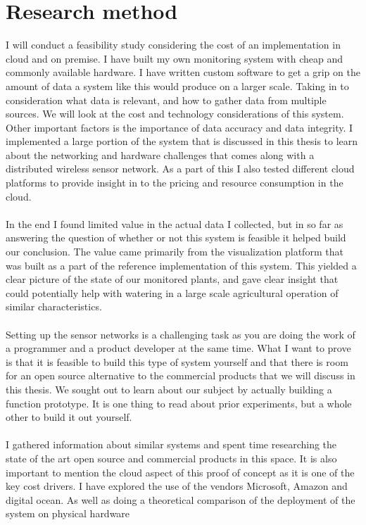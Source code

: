 \documentclass[]{uiophd}
\begin{document}
\section{Research method}
 I will conduct a feasibility study considering the cost of an implementation in cloud and on premise. I have built my own monitoring system with cheap and commonly available hardware. I have written custom software to get a grip on the amount of data a system like this would produce on a larger scale. Taking in to consideration what data is relevant, and how to gather data from multiple sources. We will look at the cost and technology considerations of this system. Other important factors is the importance of data accuracy and data integrity. I implemented a large portion of the system that is discussed in this thesis to learn about the networking and hardware challenges that comes along with a distributed wireless sensor network. As a part of this I also tested different cloud platforms to provide insight in to the pricing and resource consumption in the cloud. 
\\\\
In the end I found limited value in the actual data I collected, but in so far as answering the question of whether or not this system is feasible it helped build our conclusion. The value came primarily from the visualization platform that was built as a part of the reference implementation of this system. This yielded a clear picture of the state of our monitored plants, and gave clear insight that could potentially help with watering in a large scale agricultural operation of similar characteristics.
\\\\
Setting up the sensor networks is a challenging task as you are doing the work of a programmer and a product developer at the same time. What I want to prove is that it is feasible to build this type of system yourself and that there is room for an open source alternative to the commercial products that we will discuss in this thesis. We sought out to learn about our subject by actually building a function prototype. It is one thing to read about prior experiments, but a whole other to build it out yourself.
\\\\
I gathered information about similar systems and spent time researching the state of the art open source and commercial products in this space. It is also important to mention the cloud aspect of this proof of concept as it is one of the key cost drivers. I have explored the use of the vendors Microsoft, Amazon and digital ocean. As well as doing a theoretical comparison of the deployment of the system on physical hardware
\end{document}

